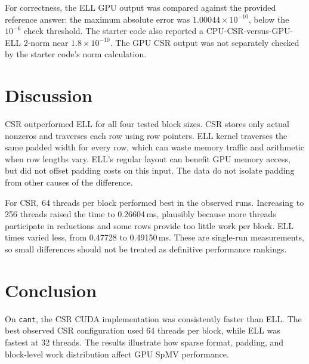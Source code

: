 \documentclass[sigconf,nonacm]{acmart}
\begin{document}
For correctness, the ELL GPU output was compared against the provided reference answer: the maximum absolute error was $1.00044\times10^{-10}$, below the $10^{-6}$ check threshold. The starter code also reported a CPU-CSR-versus-GPU-ELL 2-norm near $1.8\times10^{-10}$. The GPU CSR output was not separately checked by the starter code's norm calculation.

\section{Discussion}
CSR outperformed ELL for all four tested block sizes. CSR stores only actual nonzeros and traverses each row using row pointers. ELL kernel traverses the same padded width for every row, which can waste memory traffic and arithmetic when row lengths vary. ELL's regular layout can benefit GPU memory access, but did not offset padding costs on this input. The data do not isolate padding from other causes of the difference.

For CSR, 64 threads per block performed best in the observed runs. Increasing to 256 threads raised the time to 0.26604\,ms, plausibly because more threads participate in reductions and some rows provide too little work per block. ELL times varied less, from 0.47728 to 0.49150\,ms. These are single-run measurements, so small differences should not be treated as definitive performance rankings.

\section{Conclusion}
On \texttt{cant}, the CSR CUDA implementation was consistently faster than ELL. The best observed CSR configuration used 64 threads per block, while ELL was fastest at 32 threads. The results illustrate how sparse format, padding, and block-level work distribution affect GPU SpMV performance.
\end{document}
